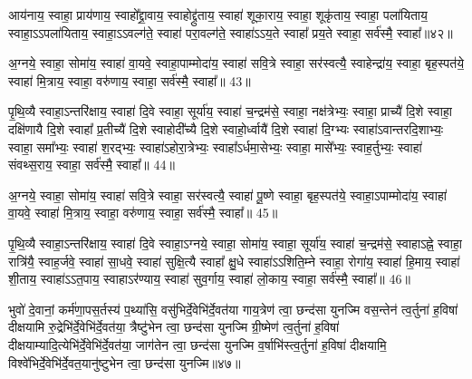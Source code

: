 {\anuvakamend[{रन्तिः॒ स्वाहा॒ द्वाविꣳ॑शतिश्च॥12॥}]}

आय॑नाय॒ स्वाहा॒ प्राय॑णाय॒ स्वाहो᳚द्द्रा॒वाय॒ स्वाहोद्द्रु॑ताय॒ स्वाहा॑ शूका॒राय॒ स्वाहा॒ शूकृ॑ताय॒ स्वाहा॒ पला॑यिताय॒ स्वाहा॒\-ऽ\-ऽपला॑यिताय॒ स्वाहा॒\-ऽ\-ऽवल्ग॑ते॒ स्वाहा॑ परा॒वल्ग॑ते॒ स्वाहा॑\-ऽ\-ऽय॒ते स्वाहा᳚ प्रय॒ते स्वाहा॒ सर्व॑स्मै॒ स्वाहा᳚॥४२॥

{\anuvakamend[{आय॑ना॒योत्त॑रमा॒पला॑यिताय॒ षड्विꣳ॑शतिः॥13॥}]}

अ॒ग्नये॒ स्वाहा॒ सोमा॑य॒ स्वाहा॑ वा॒यवे॒ स्वाहा॒पाम्मोदा॑य॒ स्वाहा॑ सवि॒त्रे स्वाहा॒ सर॑स्वत्यै॒ स्वाहेन्द्रा॑य॒ स्वाहा॒ बृह॒स्पत॑ये॒ स्वाहा॑ मि॒त्राय॒ स्वाहा॒ वरु॑णाय॒ स्वाहा॒ सर्व॑स्मै॒ स्वाहा᳚॥ 43॥

{\anuvakamend[{}]}

पृ॒थि॒व्यै स्वाहा॒\-ऽन्तरि॑क्षाय॒ स्वाहा॑ दि॒वे स्वाहा॒ सूर्या॑य॒ स्वाहा॑ च॒न्द्रम॑से॒ स्वाहा॒ नक्ष॑त्रेभ्यः॒ स्वाहा॒ प्राच्यै॑ दि॒शे स्वाहा॒ दक्षि॑णायै दि॒शे स्वाहा᳚ प्र॒तीच्यै॑ दि॒शे स्वाहोदी᳚च्यै दि॒शे स्वाहो॒र्ध्वायै॑ दि॒शे स्वाहा॑ दि॒ग्भ्यः स्वाहा॑\-ऽ\-वान्तरदि॒शाभ्यः॒ स्वाहा॒ समा᳚भ्यः॒ स्वाहा॑ श॒रद्भ्यः॒ स्वाहा॑\-ऽहोरा॒त्रेभ्यः॒ स्वाहा᳚\-ऽर्धमा॒सेभ्यः॒ स्वाहा॒ मासे᳚भ्यः॒ स्वाह॒र्तुभ्यः॒ स्वाहा॑ संवथ्स॒राय॒ स्वाहा॒ सर्व॑स्मै॒ स्वाहा᳚॥ 44॥

{\anuvakamend[{}]}

अ॒ग्नये॒ स्वाहा॒ सोमा॑य॒ स्वाहा॑ सवि॒त्रे स्वाहा॒ सर॑स्वत्यै॒ स्वाहा॑ पू॒ष्णे स्वाहा॒ बृह॒स्पत॑ये॒ स्वाहा॒\-ऽपाम्मोदा॑य॒ स्वाहा॑ वा॒यवे॒ स्वाहा॑ मि॒त्राय॒ स्वाहा॒ वरु॑णाय॒ स्वाहा॒ सर्व॑स्मै॒ स्वाहा᳚॥ 45॥

{\anuvakamend[{}]}

पृ॒थि॒व्यै स्वाहा॒\-ऽन्तरि॑क्षाय॒ स्वाहा॑ दि॒वे स्वाहा॒\-ऽग्नये॒ स्वाहा॒ सोमा॑य॒ स्वाहा॒ सूर्या॑य॒ स्वाहा॑ च॒न्द्रम॑से॒ स्वाहा\-ऽह्ने॒ स्वाहा॒ रात्रि॑यै॒ स्वाह॒र्जवे॒ स्वाहा॑ सा॒धवे॒ स्वाहा॑ सुक्षि॒त्यै स्वाहा᳚ क्षु॒धे स्वाहा॑\-ऽ\-ऽशिति॒म्ने स्वाहा॒ रोगा॑य॒ स्वाहा॑ हि॒माय॒ स्वाहा॑ शी॒ताय॒ स्वाहा॑\-ऽ\-ऽत॒पाय॒ स्वाहा\-ऽर॑ण्याय॒ स्वाहा॑ सुव॒र्गाय॒ स्वाहा॑ लो॒काय॒ स्वाहा॒ सर्व॑स्मै॒ स्वाहा᳚॥ 46॥

{\anuvakamend[{}]}

भुवो॑ दे॒वानां॒ कर्म॑णा॒पस॒र्तस्य॑ प॒थ्या॑सि॒ वसु॑भिर्दे॒वेभि॑र्दे॒वत॑या गाय॒त्रेण॑ त्वा॒ छन्द॑सा युनज्मि वस॒न्तेन॑ त्व॒र्तुना॑ ह॒विषा॑ दीक्षयामि रु॒द्रेभि॑र्दे॒वेभि॑र्दे॒वत॑या॒ त्रैष्टु॑भेन त्वा॒ छन्द॑सा युनज्मि ग्री॒ष्मेण॑ त्व॒र्तुना॑ ह॒विषा॑ दीक्षयाम्यादि॒त्येभि॑\-र्दे॒वेभि॑र्दे॒वत॑या॒ जाग॑तेन त्वा॒ छन्द॑सा युनज्मि व॒र्\mbox{}षाभि॑स्त्व॒र्तुना॑ ह॒विषा॑ दीक्षयामि॒ विश्वे॑भिर्दे॒वेभि॑र्दे॒वत॒यानु॑ष्टुभेन त्वा॒ छन्द॑सा युनज्मि॥४७॥

